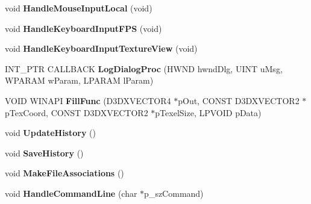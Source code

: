 \begin{DoxyCompactItemize}
\item 
\hypertarget{namespace_assimp_view_a060ddab8a5ae68820187f1e25ed43dff}{void {\bfseries Handle\+Mouse\+Input\+Local} (void)}\label{namespace_assimp_view_a060ddab8a5ae68820187f1e25ed43dff}

\item 
\hypertarget{namespace_assimp_view_ab16417edb0fd0d9753b255afa217ef47}{void {\bfseries Handle\+Keyboard\+Input\+F\+P\+S} (void)}\label{namespace_assimp_view_ab16417edb0fd0d9753b255afa217ef47}

\item 
\hypertarget{namespace_assimp_view_a88af2f0505513bab5f118ffe9da9a6ec}{void {\bfseries Handle\+Keyboard\+Input\+Texture\+View} (void)}\label{namespace_assimp_view_a88af2f0505513bab5f118ffe9da9a6ec}

\item 
\hypertarget{namespace_assimp_view_a8b428fdbba3301119f5864581dab1c26}{I\+N\+T\+\_\+\+P\+T\+R C\+A\+L\+L\+B\+A\+C\+K {\bfseries Log\+Dialog\+Proc} (H\+W\+N\+D hwnd\+Dlg, U\+I\+N\+T u\+Msg, W\+P\+A\+R\+A\+M w\+Param, L\+P\+A\+R\+A\+M l\+Param)}\label{namespace_assimp_view_a8b428fdbba3301119f5864581dab1c26}

\item 
\hypertarget{namespace_assimp_view_a29e0574819cafc2592e40a3a6f7c16a4}{V\+O\+I\+D W\+I\+N\+A\+P\+I {\bfseries Fill\+Func} (D3\+D\+X\+V\+E\+C\+T\+O\+R4 $\ast$p\+Out, C\+O\+N\+S\+T D3\+D\+X\+V\+E\+C\+T\+O\+R2 $\ast$p\+Tex\+Coord, C\+O\+N\+S\+T D3\+D\+X\+V\+E\+C\+T\+O\+R2 $\ast$p\+Texel\+Size, L\+P\+V\+O\+I\+D p\+Data)}\label{namespace_assimp_view_a29e0574819cafc2592e40a3a6f7c16a4}

\item 
\hypertarget{namespace_assimp_view_a9d224ddb26d46d976d92b3ca8b520da9}{void {\bfseries Update\+History} ()}\label{namespace_assimp_view_a9d224ddb26d46d976d92b3ca8b520da9}

\item 
\hypertarget{namespace_assimp_view_a0a142d75277b8b1d3c5fda6c74d8831a}{void {\bfseries Save\+History} ()}\label{namespace_assimp_view_a0a142d75277b8b1d3c5fda6c74d8831a}

\item 
\hypertarget{namespace_assimp_view_aff2343c333f3ee81421edd973f946a14}{void {\bfseries Make\+File\+Associations} ()}\label{namespace_assimp_view_aff2343c333f3ee81421edd973f946a14}

\item 
\hypertarget{namespace_assimp_view_a7ed22b61273a67031f524f8a133b9512}{void {\bfseries Handle\+Command\+Line} (char $\ast$p\+\_\+sz\+Command)}\label{namespace_assimp_view_a7ed22b61273a67031f524f8a133b9512}


\end{DoxyCompactItemize}
